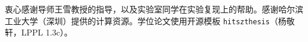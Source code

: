 \begin{acknowledgements}
衷心感谢导师王雪教授的指导，以及实验室同学在实验复现上的帮助。感谢哈尔滨工业大学（深圳）提供的计算资源。学位论文使用开源模板 \texttt{hitszthesis}（杨敬轩，LPPL 1.3c）。
\end{acknowledgements}
